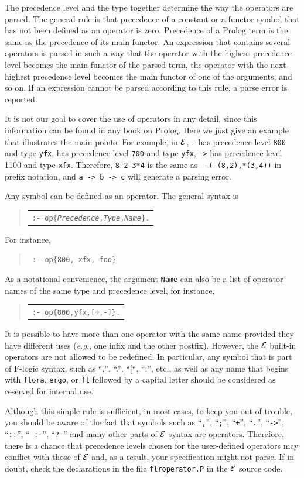 \documentclass[11pt]{article}
\newcommand{\ERGO}{\mbox{\ensuremath{\cal{E}}\smaller{{\sc{RGO}}}}\xspace}
\newcommand{\FLSYSTEM}{\ERGO}
\newenvironment{qrules}{\begin{quote}\tt\begin{tabular}[t]{l}}%
{\end{tabular}\end{quote}}
\newcommand{\fl}{\mbox{F-logic}\xspace}
\begin{document}
The precedence level and the type together determine the way the operators
are parsed. The general rule is that precedence of a constant or a functor
symbol that has not been defined as an operator is zero. Precedence of a
Prolog term is the same as the precedence of its main functor. 
An expression that contains several operators is parsed in such a way that
the operator with the highest precedence level becomes the main functor of
the parsed term, the operator with the next-highest precedence
level becomes the main functor of one of the arguments, and so on.
If an expression cannot be parsed according to this rule, a parse error is
reported.

It is not our goal to cover the use of operators in any detail, since this
information can be found in any book on Prolog. Here we just give an
example that illustrates the main points.  For example, in \FLSYSTEM, {\tt -}
has precedence level {\tt 800} and type {\tt yfx}, {\tt *} has precedence
level {\tt 700} and type {\tt yfx}, {\tt ->} has precedence level 1100 and
type {\tt xfx}.  Therefore, {\tt 8-2-3*4} is the same as {\tt
  -(-(8,2),*(3,4))} in prefix notation, and {\tt a -> b -> c} will generate
a parsing error.


%
Any symbol can be defined as an operator. The general syntax is
\begin{qrules}
{\tt :- op\{\emph{Precedence},\emph{Type},\emph{Name}\}.}
\end{qrules}
For instance, 
\begin{quote}
 {\tt
   :- op\{800, xfx, foo\}
   }
\end{quote}
As a notational convenience, the argument {\tt Name} can also be a list of
operator names of the same type and precedence level, for instance,
\begin{qrules}
{\tt :- op\{800,yfx,[+,-]\}.}
\end{qrules}
It is possible to have more than one operator with the same name provided
they have different uses ({\it e.g.}, one infix and the other postfix).
However, the \FLSYSTEM built-in operators are not allowed to be redefined.
In particular, any symbol that is part of \fl syntax, such as ``,'', ``.'',
``[``, ``:'', etc., as well as any name that begins with {\tt flora},
\texttt{ergo},  or
{\tt fl} followed by a capital letter should be considered as reserved for
internal use.

Although this simple rule is sufficient, in most cases, to keep you out of
trouble, you should be aware of the fact that symbols such as ``{\tt ,}'',
``{\tt ;}'', ``{\tt +}'', ``{\tt .}'', ``{\tt ->}'', ``{\tt ::}'', ``{\tt
  :-}'', ``{\tt ?-}'' and many
other parts of \FLSYSTEM syntax are operators. Therefore, there is a chance
that precedence levels chosen for the user-defined operators may conflict with
those of \FLSYSTEM and, as a result, your specification might not parse. If in
doubt, check the declarations in the file {\tt flroperator.P} in the \FLSYSTEM
source code.
\end{document}
